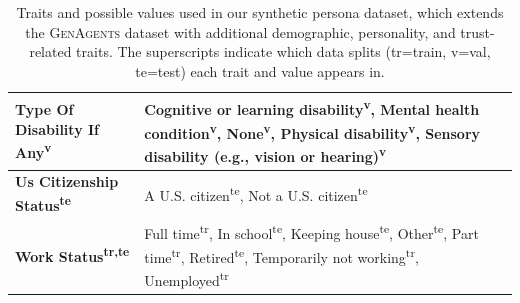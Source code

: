 \begin{table}[htbp]
{\begin{tabular}{lp{8.5cm}}
      \midrule
      \textbf{Type Of Disability If Any\textsuperscript{v}} & Cognitive or learning disability\textsuperscript{v}, Mental health condition\textsuperscript{v}, None\textsuperscript{v}, Physical disability\textsuperscript{v}, Sensory disability (e.g., vision or hearing)\textsuperscript{v} \\
      \midrule
      \textbf{Us Citizenship Status\textsuperscript{te}} & A U.S. citizen\textsuperscript{te}, Not a U.S. citizen\textsuperscript{te} \\
      \midrule
      \textbf{Work Status\textsuperscript{tr,te}} & Full time\textsuperscript{tr}, In school\textsuperscript{te}, Keeping house\textsuperscript{te}, Other\textsuperscript{te}, Part time\textsuperscript{tr}, Retired\textsuperscript{te}, Temporarily not working\textsuperscript{tr}, Unemployed\textsuperscript{tr} \\
      \midrule
      \bottomrule
    \end{tabular}
    }
    \caption{Traits and possible values used in our synthetic persona dataset, which extends the \textsc{GenAgents} dataset with additional demographic, personality, and trust-related traits. The superscripts indicate which data splits (tr=train, v=val, te=test) each trait and value appears in.}
    \label{tab:attributes}
  \end{table}